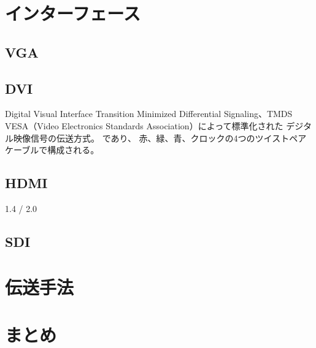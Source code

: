 \section{インターフェース}
\label{sec:interface}

\subsection{VGA}


\subsection{DVI}
Digital Visual Interface
Transition Minimized Differential Signaling、TMDS
VESA（Video Electronics Standards Association）によって標準化された デジタル映像信号の伝送方式。
であり、
赤、緑、青、クロックの4つのツイストペアケーブルで構成される。

\subsection{HDMI}
1.4 / 2.0

\subsection{SDI}



\section{伝送手法}

\section{まとめ}
